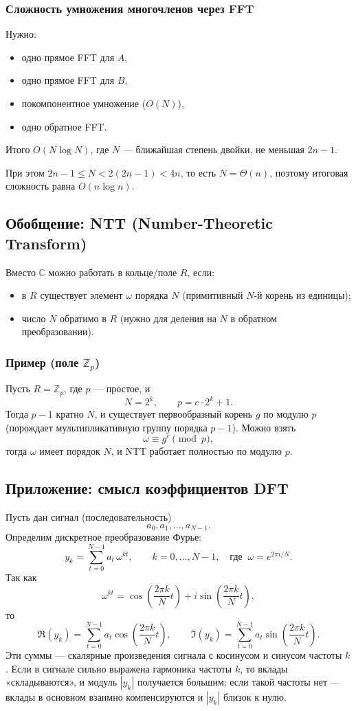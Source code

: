 \subsubsection*{Сложность умножения многочленов через FFT}

Нужно:
\begin{itemize}
	\item одно прямое FFT для $A$,
	\item одно прямое FFT для $B$,
	\item покомпонентное умножение ($O(N)$),
	\item одно обратное FFT.
\end{itemize}
Итого $O(N\log N)$, где $N$ — ближайшая степень двойки, не меньшая $2n-1$.

При этом $2n-1 \le N < 2(2n-1) < 4n$, то есть $N=\Theta(n)$, поэтому итоговая сложность равна $O(n\log n)$.

\subsection*{Обобщение: NTT (Number-Theoretic Transform)}

Вместо $\mathbb{C}$ можно работать в кольце/поле $R$, если:
\begin{itemize}
	\item в $R$ существует элемент $\omega$ порядка $N$ (примитивный $N$-й корень из единицы);
	\item число $N$ обратимо в $R$ (нужно для деления на $N$ в обратном преобразовании).
\end{itemize}

\subsubsection*{Пример (поле $\mathbb{Z}_p$)}

Пусть $R=\mathbb{Z}_p$, где $p$ — простое, и
\[
N=2^k,\qquad p=c\cdot 2^k+1.
\]
Тогда $p-1$ кратно $N$, и существует первообразный корень $g$ по модулю $p$
(порождает мультипликативную группу порядка $p-1$).
Можно взять
\[
\omega \equiv g^c \pmod p,
\]
тогда $\omega$ имеет порядок $N$, и NTT работает полностью по модулю $p$.

\subsection*{Приложение: смысл коэффициентов DFT}

Пусть дан сигнал (последовательность)
\[
a_0,a_1,\dots,a_{N-1}.
\]
Определим дискретное преобразование Фурье:
\[
y_k=\sum_{t=0}^{N-1} a_t\,\omega^{kt},\qquad k=0,\dots,N-1,
\quad \text{где }\ \omega=e^{2\pi i/N}.
\]
Так как
\[
\omega^{kt}=\cos\!\left(\frac{2\pi k}{N}t\right)+
i\sin\!\left(\frac{2\pi k}{N}t\right),
\]
то
\[
\Re(y_k)=\sum_{t=0}^{N-1} a_t\cos\!\left(\frac{2\pi k}{N}t\right),
\qquad
\Im(y_k)=\sum_{t=0}^{N-1} a_t\sin\!\left(\frac{2\pi k}{N}t\right).
\]
Эти суммы — скалярные произведения сигнала с косинусом и синусом частоты $k$.
Если в сигнале сильно выражена гармоника частоты $k$, то вклады «складываются»,
и модуль $|y_k|$ получается большим; если такой частоты нет — вклады
в основном взаимно компенсируются и $|y_k|$ близок к нулю.

